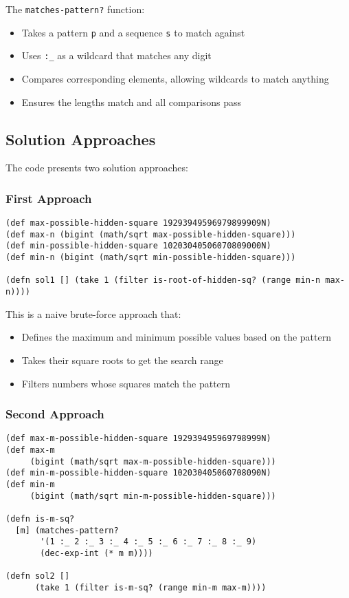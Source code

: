 \documentclass{article}
\begin{document}
The \texttt{matches-pattern?} function:
\begin{itemize}
    \item Takes a pattern \texttt{p} and a sequence \texttt{s} to match against
    \item Uses \texttt{:\_} as a wildcard that matches any digit
    \item Compares corresponding elements, allowing wildcards to match anything
    \item Ensures the lengths match and all comparisons pass
\end{itemize}

\subsection{Solution Approaches}

The code presents two solution approaches:

\subsubsection{First Approach}
\begin{lstlisting}
(def max-possible-hidden-square 19293949596979899909N)
(def max-n (bigint (math/sqrt max-possible-hidden-square)))
(def min-possible-hidden-square 10203040506070809000N)
(def min-n (bigint (math/sqrt min-possible-hidden-square)))

(defn sol1 [] (take 1 (filter is-root-of-hidden-sq? (range min-n max-n))))
\end{lstlisting}

This is a naive brute-force approach that:
\begin{itemize}
    \item Defines the maximum and minimum possible values based on the pattern
    \item Takes their square roots to get the search range
    \item Filters numbers whose squares match the pattern
\end{itemize}

\subsubsection{Second Approach}
\begin{lstlisting}
(def max-m-possible-hidden-square 192939495969798999N)
(def max-m 
     (bigint (math/sqrt max-m-possible-hidden-square)))
(def min-m-possible-hidden-square 102030405060708090N)
(def min-m 
     (bigint (math/sqrt min-m-possible-hidden-square)))

(defn is-m-sq?
  [m] (matches-pattern?
       '(1 :_ 2 :_ 3 :_ 4 :_ 5 :_ 6 :_ 7 :_ 8 :_ 9)
       (dec-exp-int (* m m))))

(defn sol2 [] 
      (take 1 (filter is-m-sq? (range min-m max-m))))
\end{lstlisting}
\end{document}
